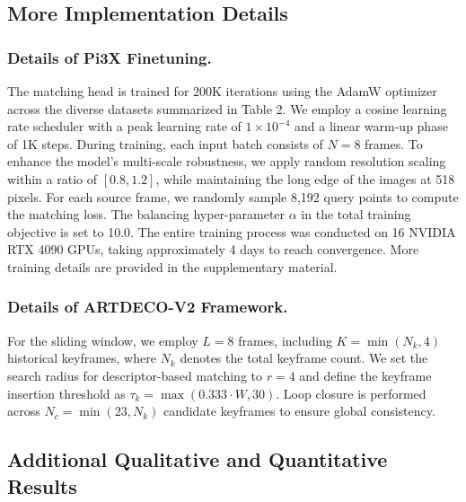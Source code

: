 \subsection{More Implementation Details}
\label{sec:implementation}
\subsubsection{Details of Pi3X Finetuning.}
The matching head is trained for 200K iterations using the AdamW optimizer across the diverse datasets summarized in Table 2. We employ a cosine learning rate scheduler with a peak learning rate of $1 \times 10^{-4}$ and a linear warm-up phase of 1K steps.
During training, each input batch consists of $N=8$ frames. To enhance the model's multi-scale robustness, we apply random resolution scaling within a ratio of $[0.8, 1.2]$, while maintaining the long edge of the images at 518 pixels. For each source frame, we randomly sample 8,192 query points to compute the matching loss. The balancing hyper-parameter $\alpha$ in the total training objective is set to 10.0. The entire training process was conducted on 16 NVIDIA RTX 4090 GPUs, taking approximately 4 days to reach convergence. More training details are provided in the supplementary material.

\subsubsection{Details of ARTDECO-V2 Framework.}
For the sliding window, we employ $L=8$ frames, including $K = \min(N_k, 4)$ historical keyframes, where $N_k$ denotes the total keyframe count. We set the search radius for descriptor-based matching to $r=4$ and define the keyframe insertion threshold as $\tau_k = \max(0.333 \cdot W, 30)$. Loop closure is performed across $N_c = \min(23, N_k)$ candidate keyframes to ensure global consistency.


\subsection{Additional Qualitative and Quantitative Results}
\label{sec:exp}

